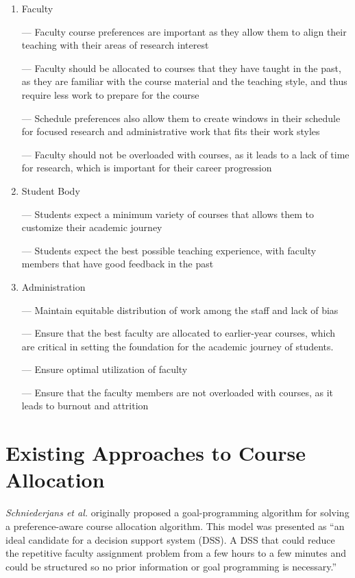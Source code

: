 \begin{enumerate}
  \item Faculty

        — Faculty course preferences are important as they allow them to align their teaching with their areas of research interest

        — Faculty should be allocated to courses that they have taught in the past, as they are familiar with the course material and the teaching style, and thus require less work to prepare for the course

        — Schedule preferences also allow them to create windows in their schedule for focused research and administrative work that fits their work styles

        — Faculty should not be overloaded with courses, as it leads to a lack of time for research, which is important for their career progression

  \item Student Body

        — Students expect a minimum variety of courses that allows them to customize their academic journey

        — Students expect the best possible teaching experience, with faculty members that have good feedback in the past

  \item Administration

        — Maintain equitable distribution of work among the staff and lack of bias

        — Ensure that the best faculty are allocated to earlier-year courses, which are critical in setting the foundation for the academic journey of students.

        — Ensure optimal utilization of faculty

        — Ensure that the faculty members are not overloaded with courses, as it leads to burnout and attrition

\end{enumerate}

\section{Existing Approaches to Course Allocation}

\textit{Schniederjans et al.} \cite{schniederjans1987goal} originally proposed a goal-programming algorithm for solving a preference-aware course allocation algorithm. This model was presented as ``an ideal candidate for a decision support system (DSS). A DSS that could reduce the repetitive faculty assignment problem from a few hours to a few minutes and could be structured so no prior information or goal programming is necessary.''

